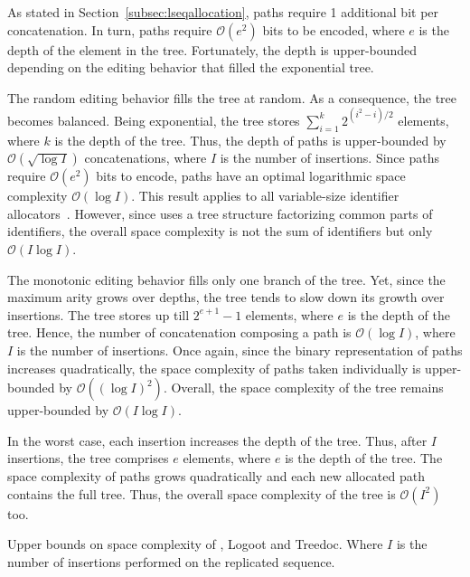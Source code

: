 As stated in Section~\ref{subsec:lseqallocation}, paths require 1 additional bit
per concatenation. In turn, paths require $\mathcal{O}(e^2)$ bits to be encoded,
where $e$ is the depth of the element in the tree. Fortunately, the depth is
upper-bounded depending on the editing behavior that filled the exponential
tree.

The random editing behavior fills the tree at random. As a consequence, the tree
becomes balanced. Being exponential, the tree stores
$\textstyle\sum\nolimits_{i=1}^{k}{2^{(i^2-i)/2}}$ elements, where $k$ is the
depth of the tree. Thus, the depth of paths is upper-bounded by
$\mathcal{O}(\sqrt{\log I})$ concatenations, where $I$ is the number of
insertions. Since paths require $\mathcal{O}(e^2)$ bits to encode, paths have an
optimal logarithmic space complexity $\mathcal{O}(\log I)$. This result applies
to all variable-size identifier allocators~\cite{preguica2009commutative,
  weiss2009logoot}. However, since \LSEQ uses a tree structure factorizing
common parts of identifiers, the overall space complexity is not the sum of
identifiers but only $\mathcal{O}(I\log I)$.

The monotonic editing behavior fills only one branch of the tree. Yet, since the
maximum arity grows over depths, the tree tends to slow down its growth over
insertions. The tree stores up till $2^{e+1}-1$ elements, where $e$ is the depth
of the tree. Hence, the number of concatenation composing a path is
$\mathcal{O}(\log I)$, where $I$ is the number of insertions. Once again, since
the binary representation of paths increases quadratically, the space complexity
of paths taken individually is upper-bounded by $\mathcal{O}((\log I)^2)$.
Overall, the space complexity of the tree remains upper-bounded by
$\mathcal{O}(I\log I)$.

In the worst case, each insertion increases the depth of the tree. Thus, after
$I$ insertions, the tree comprises $e$ elements, where $e$ is the depth of the
tree. The space complexity of paths grows quadratically and each new allocated
path contains the full tree. Thus, the overall space complexity of the tree is
$\mathcal{O}(I^2)$ too.

\begin{table}
  \caption{\label{table:lseqspace}
    Upper bounds on space complexity of \LSEQ, Logoot and Treedoc. Where
    $I$ is the number of insertions performed on the replicated sequence.}
  \centering
  
\end{table}

